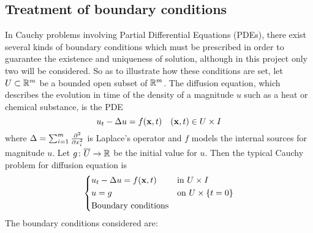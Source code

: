
\subsection{Treatment of boundary conditions}

In Cauchy problems involving Partial Differential Equations (PDEs), there exist several kinds of boundary conditions which must be prescribed in order to guarantee the existence and uniqueness of solution, although in this project only two will be considered. So as to illustrate how these conditions are set, let $U \subset \mathbb{R}^m$ be a bounded open subset of $\mathbb{R}^m$. The diffusion equation, which describes the evolution in time of the density of a magnitude $u$ such as a heat or chemical substance, is the PDE
\begin{equation} \label{eq:boundary_conditions_heat_equation}
	u_t - \Delta u = f(\vb{x}, t) \quad (\vb{x}, t) \in U \times I
\end{equation}
where $\Delta = \sum_{i=1}^{m} \pdv[2]{}{x_i}$ is Laplace's operator and $f$ models the internal sources for magnitude $u$. Let $g \colon \overline{U} \rightarrow \mathbb{R}$ be the initial value for $u$. Then the typical Cauchy problem for diffusion equation is
\begin{equation} \label{eq:boundary_conditions_problem}
	\left\{
	\begin{aligned}
		&u_t - \Delta u = f(\vb{x}, t) & &\text{in } U \times I \\
		&u = g & &\text{on } U \times \{ t = 0 \} \\
		&\text{Boundary conditions}
	\end{aligned}
	\right.
\end{equation}
The boundary conditions considered are:
